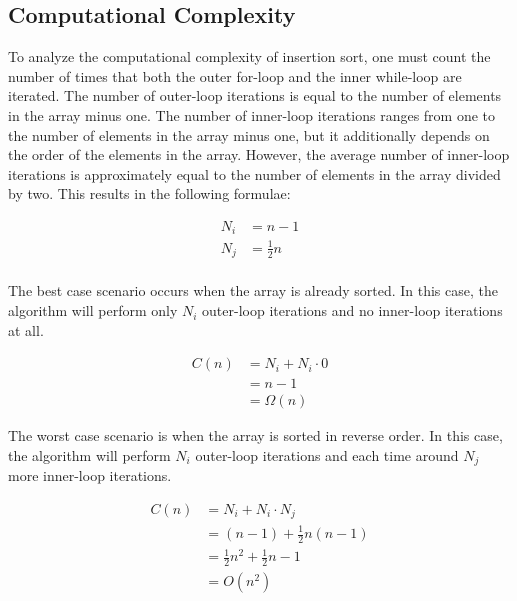 \documentclass[titlepage, a4paper, 12pt]{article}
\begin{document}
    \subsection{Computational Complexity}

    To analyze the computational complexity of insertion sort, one must count the number of times that both the outer for-loop and the inner while-loop are iterated. The number of outer-loop iterations is equal to the number of elements in the array minus one. The number of inner-loop iterations ranges from one to the number of elements in the array minus one, but it additionally depends on the order of the elements in the array. However, the average number of inner-loop iterations is approximately equal to the number of elements in the array divided by two. This results in the following formulae:

    \begin{equation*}
        \begin{aligned}
            N_i &= n - 1 \\
            N_j &= \frac{1}{2}n \\
        \end{aligned}
    \end{equation*}

    The best case scenario occurs when the array is already sorted. In this case, the algorithm will perform only $N_i$ outer-loop iterations and no inner-loop iterations at all.
    
    \begin{equation*}
        \begin{aligned}
            C(n) &= N_i + N_i \cdot 0 \\
            &= n - 1 \\
            &= \Omega(n)
        \end{aligned}
    \end{equation*}

    The worst case scenario is when the array is sorted in reverse order. In this case, the algorithm will perform $N_i$ outer-loop iterations and each time around $N_j$ more inner-loop iterations.
    
    \begin{equation*}
        \begin{aligned}
            C(n) &= N_i + N_i \cdot N_j \\
            &= (n - 1) + \frac{1}{2}n(n - 1) \\
            &= \frac{1}{2}n^2 + \frac{1}{2}n - 1 \\
            &= O(n^2)
        \end{aligned}
    \end{equation*}
    
\end{document}

